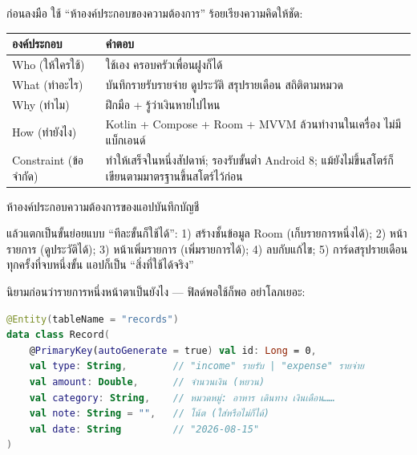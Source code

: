


ก่อนลงมือ ใช้ “ห้าองค์ประกอบของความต้องการ” ร้อยเรียงความคิดให้ชัด:

\begin{center}
\begin{tabularx}{\linewidth}{|X|X|}
\hline
\textbf{องค์ประกอบ} & \textbf{คำตอบ} \tabularnewline
\hline
Who (ให้ใครใช้) & ใช้เอง ครอบครัวเพื่อนฝูงก็ได้ \tabularnewline
What (ทำอะไร) & บันทึกรายรับรายจ่าย ดูประวัติ สรุปรายเดือน สถิติตามหมวด \tabularnewline
Why (ทำไม) & ฝึกมือ + รู้ว่าเงินหายไปไหน \tabularnewline
How (ทำยังไง) & Kotlin + Compose + Room + MVVM ล้วนทำงานในเครื่อง ไม่มีแบ็กเอนด์ \tabularnewline
Constraint (ข้อจำกัด) & ทำให้เสร็จในหนึ่งสัปดาห์; รองรับขั้นต่ำ Android 8; แม้ยังไม่ขึ้นสโตร์ก็เขียนตามมาตรฐานขึ้นสโตร์ไว้ก่อน \tabularnewline
\hline
\end{tabularx}
\end{center}

\begin{center}\small\color{gray}ห้าองค์ประกอบความต้องการของแอปบันทึกบัญชี\end{center}

แล้วแตกเป็นขั้นย่อยแบบ “ทีละขั้นก็ใช้ได้”: 1) สร้างชั้นข้อมูล Room (เก็บรายการหนึ่งได้); 2) หน้ารายการ (ดูประวัติได้); 3) หน้าเพิ่มรายการ (เพิ่มรายการได้); 4) ลบกับแก้ไข; 5) การ์ดสรุปรายเดือน ทุกครั้งที่จบหนึ่งขั้น แอปก็เป็น “สิ่งที่ใช้ได้จริง”


นิยามก่อนว่ารายการหนึ่งหน้าตาเป็นยังไง — ฟิลด์พอใช้ก็พอ อย่าโลภเยอะ:

\begin{lstlisting}[language=Kotlin]
@Entity(tableName = "records")
data class Record(
    @PrimaryKey(autoGenerate = true) val id: Long = 0,
    val type: String,        // "income" รายรับ | "expense" รายจ่าย
    val amount: Double,      // จำนวนเงิน (หยวน)
    val category: String,    // หมวดหมู่: อาหาร เดินทาง เงินเดือน……
    val note: String = "",   // โน้ต (ใส่หรือไม่ก็ได้)
    val date: String         // "2026-08-15"
)
\end{lstlisting}

